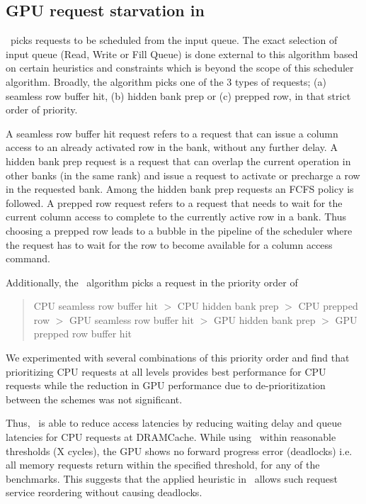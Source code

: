 \subsection{GPU request starvation in \prioname}
\prioname\ picks requests to be scheduled from the input queue. The exact selection of input queue (Read, Write or Fill Queue) is done external to this algorithm based on certain heuristics and constraints which is beyond the scope of this scheduler algorithm. Broadly, the algorithm picks one of the 3 types of requests; (a) seamless row buffer hit, (b) hidden bank prep or (c) prepped row, in that strict order of priority. 
\par A seamless row buffer hit request refers to a request that can issue a column access to an already activated row in the bank, without any further delay. A hidden bank prep request is a request that can overlap the current operation in other banks (in the same rank) and issue a request to activate or precharge a row in the requested bank. Among the hidden bank prep requests an FCFS policy is followed. A prepped row request refers to a request that needs to wait for the current column access to complete to the currently active row in a bank. Thus choosing a prepped row leads to a bubble in the pipeline of the scheduler where the request has to wait for the row to become available for a column access command.

\par Additionally, the \prioname\ algorithm picks a request in the priority order of
\begin{quote}
	CPU seamless row buffer hit $>$ CPU hidden bank prep $>$ CPU prepped row $>$ GPU seamless row buffer hit $>$ GPU hidden bank prep $>$ GPU prepped row buffer hit
\end{quote}
We experimented with several combinations of this priority order and find that prioritizing CPU requests at all levels provides best performance for CPU requests while the reduction in GPU performance due to de-prioritization between the schemes was not significant.
\par Thus, \prioname\ is able to reduce access latencies by reducing waiting delay and queue latencies for CPU requests at DRAMCache. While using \prioname\ within reasonable thresholds (X cycles), the GPU shows no forward progress error (deadlocks)  i.e. all memory requests return within the specified threshold, for any of the benchmarks. This suggests that the applied heuristic in \prioname\ allows such request service reordering without causing deadlocks.

